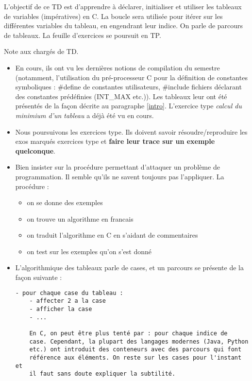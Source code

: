 
\newcommand{\commentaire}[1]{}


L'objectif de ce TD est d'apprendre à déclarer, initialiser et utiliser les tableaux de variables (impératives) en C. La boucle  sera utilisée pour itérer sur les différentes variables du tableau, en engendrant leur indice. On parle de parcours de tableaux. La feuille d'exercices se poursuit en TP.

\begin{correction}
  Note aux chargés de TD.
  \begin{itemize}
  \item En cours, ils ont vu les dernières notions de compilation du semestre (notamment, l'utilisation du pré-processeur C pour la définition de constantes symboliques : \#define de constantes utilisateurs, \#include fichiers déclarant des constantes prédéfinies (INT\_MAX etc.)). Les tableaux leur ont été présentés de la façon décrite au paragraphe \ref{intro}. L'exercice type \emph{calcul du minimium d'un tableau} a déjà été vu en cours.
  \item Nous poursuivons les exercices type. Ils doivent
    savoir résoudre/reproduire les exos marqués exercices type et
    \textbf{faire leur trace sur un exemple quelconque}.

  \item Bien insister sur la procédure permettant d'attaquer un problème de programmation. Il semble qu'ils ne savent toujours pas l'appliquer. La procédure :
    \begin{itemize}
    \item on se donne des exemples
    \item on trouve un algorithme en francais
    \item on traduit l'algorithme en C en s'aidant de commentaires
    \item on test sur les exemples qu'on s'est donné
    \end{itemize}
  \item L'algorithmique des tableaux parle de cases, et un parcours se présente de la façon suivante :
\begin{verbatim}
- pour chaque case du tableau :
    - affecter 2 a la case
    - afficher la case
    - ...

    En C, on peut être plus tenté par : pour chaque indice de
    case. Cependant, la plupart des langages modernes (Java, Python
    etc.) ont introduit des conteneurs avec des parcours qui font
    référence aux éléments. On reste sur les cases pour l'instant et
    il faut sans doute expliquer la subtilité.
\end{verbatim}
  \end{itemize}
\end{correction}

